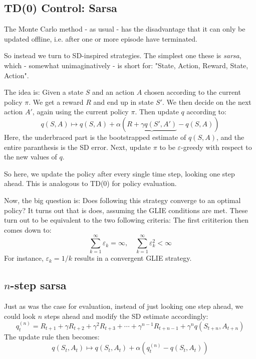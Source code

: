 \documentclass[12pt, a4paper]{article}
\numberwithin{equation}{section}
\begin{document}
\subsection{TD(0) Control: Sarsa}
The Monte Carlo method - as usual - has the disadvantage that it can only be updated offline, i.e. after one or more episode have terminated.

So instead we turn to SD-inspired strategies. The simplest one these is \textit{sarsa}, which - somewhat unimaginatively - is short for: "State, Action, Reward, State, Action".

The idea is: Given a state $S$ and an action $A$ chosen according to the current policy $\pi$. We get a reward $R$ and end up in state $S'$. We then decide on the next action $A'$, again using the current policy $\pi$. Then update $q$ according to:
\begin{equation}
q(S,A)\mapsto q(S,A)+\alpha(\underbrace{R+\gamma q(S',A')}-q(S,A))
\end{equation}
Here, the underbraced part is the bootstrapped estimate of $q(S,A)$, and the entire paranthesis is the SD error. Next, update $\pi$ to be $\varepsilon$-greedy with respect to the new values of $q$.

So here, we update the policy after every single time step, looking one step ahead. This is analogous to TD(0) for policy evaluation.

Now, the big question is: Does following this strategy converge to an optimal policy? It turns out that is does, assuming the GLIE conditions are met. These turn out to be equivalent to the two following criteria:
 The first crititerion then comes down to:
\begin{equation}
\sum_{k=1}^\infty\varepsilon_k=\infty,\quad
\sum_{k=1}^\infty\varepsilon_k^2<\infty
\end{equation}
For instance, $\varepsilon_k=1/k$ results in a convergent GLIE strategy. 

\subsection{$n$-step sarsa}
Just as was the case for evaluation, instead of just looking one step ahead, we could look $n$ steps ahead and modify the SD estimate accordingly:
\begin{equation}
q_t^{(n)}=R_{t+1}+\gamma R_{t+2}+\gamma^2 R_{t+3}+\cdots+\gamma^{n-1}R_{t+n-1}+\gamma^n q(S_{t+n},A_{t+n})
\end{equation}
The update rule then becomes:
\begin{equation}
q(S_t,A_t)\mapsto q(S_t,A_t)+\alpha(q_t^{(n)}-q(S_t,A_t))
\end{equation}
\end{document}
